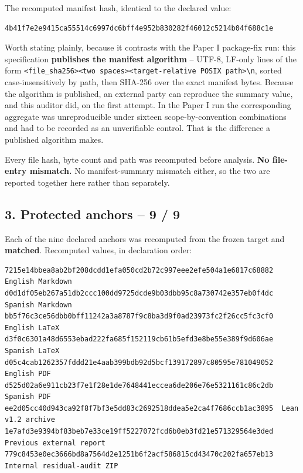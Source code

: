 \documentclass[
  10pt,
]{article}
\begin{document}
The recomputed manifest hash, identical to the declared value:

\begin{verbatim}
4b41f7e2e9415ca55514c6997dc6bff4e952b830282f46012c5214b04f688c1e
\end{verbatim}

Worth stating plainly, because it contrasts with the Paper I package-fix
run: this specification \textbf{publishes the manifest algorithm} --
UTF-8, LF-only lines of the form
\texttt{\textless{}file\_sha256\textgreater{}\textless{}two\ spaces\textgreater{}\textless{}target-relative\ POSIX\ path\textgreater{}\textbackslash{}n},
sorted case-insensitively by path, then SHA-256 over the exact manifest
bytes. Because the algorithm is published, an external party can
reproduce the summary value, and this auditor did, on the first attempt.
In the Paper I run the corresponding aggregate was unreproducible under
sixteen scope-by-convention combinations and had to be recorded as an
unverifiable control. That is the difference a published algorithm
makes.

Every file hash, byte count and path was recomputed before analysis.
\textbf{No file-entry mismatch.} No manifest-summary mismatch either, so
the two are reported together here rather than separately.

\subsection{3. Protected anchors -- 9 / 9}\label{protected-anchors-9-9}

Each of the nine declared anchors was recomputed from the frozen target
and \textbf{matched}. Recomputed values, in declaration order:

\begin{verbatim}
7215e14bbea8ab2bf208dcdd1efa050cd2b72c997eee2efe504a1e6817c68882  English Markdown
d0d1df05eb267a51db2ccc100dd9725dcde9b03dbb95c8a730742e357eb0f4dc  Spanish Markdown
bb5f76c3ce56dbb0bff11242a3a8787f9c8ba3d9f0ad23973fc2f26cc5fc3cf0  English LaTeX
d3f0c6301a48d6553ebad222fa685f152119cb61b5efd3e8be55e389f9d606ae  Spanish LaTeX
d05c4cab1262357fddd21e4aab399bdb92d5bcf139172897c80595e781049052  English PDF
d525d02a6e911cb23f7e1f28e1de7648441eccea6de206e76e5321161c86c2db  Spanish PDF
ee2d05cc40d943ca92f8f7bf3e5dd83c2692518ddea5e2ca4f7686ccb1ac3895  Lean v1.2 archive
1e7afd3e9394bf83beb7e33ce19ff5227072fcd6b0eb3fd21e571329564e3ded  Previous external report
779c8453e0ec3666bd8a7564d2e1251b6f2acf586815cd43470c202fa657eb13  Internal residual-audit ZIP
\end{verbatim}
\end{document}
